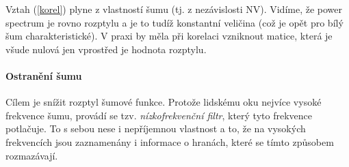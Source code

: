 Vztah (\ref{korel}) plyne z vlastností šumu (tj. z nezávislosti NV). Vidíme, že power spectrum je rovno rozptylu a je to tudíž 
konstantní veličina (což je opět pro bílý šum charakteristické). V praxi by měla při korelaci vzniknout matice,
která je všude nulová jen vprostřed je hodnota rozptylu.

\paragraph{Ostranění šumu} 

Cílem je snížit rozptyl šumové funkce. Protože lidskému oku nejvíce  vysoké frekvence šumu, provádí
se tzv. \emph{nízkofrekvenční filtr}, který tyto frekvence potlačuje. To s sebou nese i nepříjemnou vlastnost a to, že
na vysokých frekvencích jsou zaznamenány i informace o hranách, které se tímto způsobem rozmazávají.


